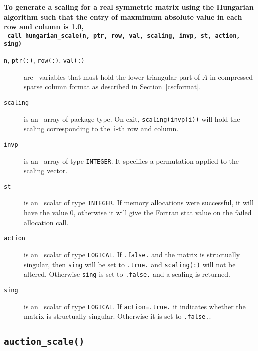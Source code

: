 \textbf{\noindent
   To generate a scaling for a real symmetric matrix using the Hungarian algorithm such that the entry of maxmimum absolute value in each row and column is 1.0,
   \vspace*{0.1cm} \\
   \texttt{ \hspace*{0.2cm}
      call hungarian\_scale(n, ptr, row, val, scaling, invp, st, action, sing)
   }
   \vspace{0.3cm}
}

\begin{description}

\item[\texttt{n}, \texttt{ptr(:)}, \texttt{row(:)}, \texttt{val(:)}] are \intentin\ variables that must hold the lower triangular part of $A$ in compressed sparse column format as described in Section~\ref{cscformat}.

\item[\texttt{scaling}] is an \intentout\ array of package type. On exit,
\texttt{scaling(invp(i))} will hold the scaling corresponding to the
\texttt{i}-th row and column.

\item[\texttt{invp}] is an \intentin\ array of type {\tt INTEGER}. It specifies
a permutation applied to the scaling vector.

\item[\texttt{st}] is an \intentout\ scalar of type {\tt INTEGER}. If memory allocations were successful, it will have the value 0, otherwise it will give the
Fortran stat value on the failed allocation call.

\item[\texttt{action}] is an \intentin\ scalar of type {\tt LOGICAL}. If
\texttt{.false.} and the matrix is structually singular, then \texttt{sing}
will be set to \texttt{.true.} and \texttt{scaling(:)} will not be altered.
Otherwise \texttt{sing} is set to \texttt{.false.} and a scaling is returned.

\item[\texttt{sing}] is an \intentout\ scalar of type {\tt LOGICAL}. If
\texttt{action=.true.} it indicates whether the matrix is structually
singular. Otherwise it is set to \texttt{.false.}.

\end{description}


\subsection{\texttt{auction\_scale()}}

